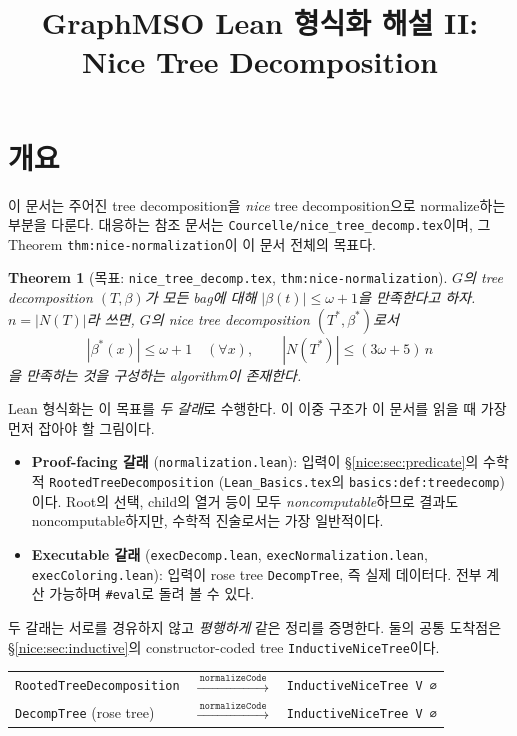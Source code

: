 \documentclass[11pt]{article}
\title{GraphMSO Lean 형식화 해설 II: Nice Tree Decomposition}
\author{}
\date{}
\theoremstyle{definition}
\theoremstyle{plain}
\newtheorem{theorem}[definition]{Theorem}
\newcommand{\lean}[1]{\texttt{#1}}
\newcommand{\leanfile}[1]{\texttt{#1}}
\begin{document}
\maketitle

\tableofcontents

\section{개요}

이 문서는 주어진 tree decomposition을 \emph{nice} tree decomposition으로
normalize하는 부분을 다룬다. 대응하는 참조 문서는
\leanfile{Courcelle/nice\_tree\_decomp.tex}이며, 그 Theorem
\lean{thm:nice-normalization}이 이 문서 전체의 목표다.

\begin{theorem}[목표: \leanfile{nice\_tree\_decomp.tex}, \lean{thm:nice-normalization}]
\label{nice:thm:goal}
$G$의 tree decomposition $(T, \beta)$가 모든 bag에 대해
$|\beta(t)| \le \omega+1$을 만족한다고 하자. $n = |N(T)|$라 쓰면, $G$의
nice tree decomposition $(T^\ast, \beta^\ast)$로서
\[
  |\beta^\ast(x)| \le \omega + 1 \quad (\forall x), \qquad
  |N(T^\ast)| \le (3\omega+5)\,n
\]
을 만족하는 것을 구성하는 algorithm이 존재한다.
\end{theorem}

Lean 형식화는 이 목표를 \emph{두 갈래}로 수행한다. 이 이중 구조가 이 문서를
읽을 때 가장 먼저 잡아야 할 그림이다.

\begin{itemize}
  \item \textbf{Proof-facing 갈래} (\leanfile{normalization.lean}): 입력이
    \S\ref{nice:sec:predicate}의 수학적 \lean{RootedTreeDecomposition}
    (\leanfile{Lean\_Basics.tex}의 \lean{basics:def:treedecomp})이다.
    Root의 선택, child의 열거 등이 모두 \emph{noncomputable}하므로 결과도
    noncomputable하지만, 수학적 진술로서는 가장 일반적이다.
  \item \textbf{Executable 갈래} (\leanfile{execDecomp.lean},
    \leanfile{execNormalization.lean}, \leanfile{execColoring.lean}): 입력이
    rose tree \lean{DecompTree}, 즉 실제 데이터다. 전부 계산 가능하며
    \lean{\#eval}로 돌려 볼 수 있다.
\end{itemize}

두 갈래는 서로를 경유하지 않고 \emph{평행하게} 같은 정리를 증명한다. 둘의
공통 도착점은 \S\ref{nice:sec:inductive}의 constructor-coded tree
\lean{InductiveNiceTree}이다.

\begin{center}
\begin{tabular}{lcl}
  \lean{RootedTreeDecomposition} & $\xrightarrow{\ \lean{normalizeCode}\ }$ & \lean{InductiveNiceTree V ∅} \\
  \lean{DecompTree} (rose tree) & $\xrightarrow{\ \lean{normalizeCode}\ }$ & \lean{InductiveNiceTree V ∅} \\
\end{tabular}
\end{center}
\end{document}
